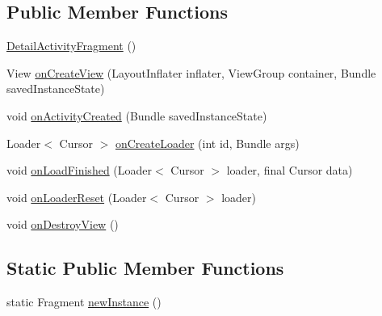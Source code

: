 \subsection*{Public Member Functions}
\begin{DoxyCompactItemize}
\item 
\hyperlink{classorg_1_1buildmlearn_1_1toolkit_1_1infotemplate_1_1fragment_1_1DetailActivityFragment_aa8587c189f345541c08c36f228c76da5}{Detail\+Activity\+Fragment} ()
\item 
View \hyperlink{classorg_1_1buildmlearn_1_1toolkit_1_1infotemplate_1_1fragment_1_1DetailActivityFragment_abc01631f270c10cd191a70cee5f06e0e}{on\+Create\+View} (Layout\+Inflater inflater, View\+Group container, Bundle saved\+Instance\+State)
\item 
void \hyperlink{classorg_1_1buildmlearn_1_1toolkit_1_1infotemplate_1_1fragment_1_1DetailActivityFragment_a613f9589fc3771358aa485cc468c22ff}{on\+Activity\+Created} (Bundle saved\+Instance\+State)
\item 
Loader$<$ Cursor $>$ \hyperlink{classorg_1_1buildmlearn_1_1toolkit_1_1infotemplate_1_1fragment_1_1DetailActivityFragment_a0acdea5f623f7fa01079e34c0b45832b}{on\+Create\+Loader} (int id, Bundle args)
\item 
void \hyperlink{classorg_1_1buildmlearn_1_1toolkit_1_1infotemplate_1_1fragment_1_1DetailActivityFragment_a1d930b3a1c5e1f1fb0f32ed2d0941466}{on\+Load\+Finished} (Loader$<$ Cursor $>$ loader, final Cursor data)
\item 
void \hyperlink{classorg_1_1buildmlearn_1_1toolkit_1_1infotemplate_1_1fragment_1_1DetailActivityFragment_a2878d9707eb69ac72b89a87630da7f6b}{on\+Loader\+Reset} (Loader$<$ Cursor $>$ loader)
\item 
void \hyperlink{classorg_1_1buildmlearn_1_1toolkit_1_1infotemplate_1_1fragment_1_1DetailActivityFragment_a27c6f36e0fda69ee3ed8f97d841d1f42}{on\+Destroy\+View} ()
\end{DoxyCompactItemize}
\subsection*{Static Public Member Functions}
\begin{DoxyCompactItemize}
\item 
static Fragment \hyperlink{classorg_1_1buildmlearn_1_1toolkit_1_1infotemplate_1_1fragment_1_1DetailActivityFragment_a403545d37c465a0b3b52f761972c19d3}{new\+Instance} ()
\end{DoxyCompactItemize}

